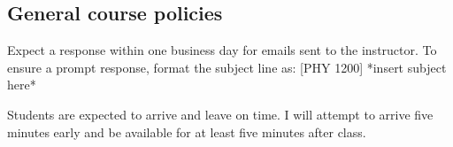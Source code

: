 \documentclass{syllabus}
\begin{document}
\subsection{General course policies}
Expect a response within one business day for emails sent to the instructor. To ensure a prompt response, format the subject line as: [PHY 1200] *insert subject here*

Students are expected to arrive and leave on time. I will attempt to arrive five minutes early and be available for at least five minutes after class.
\collegepolicies
\end{document}
